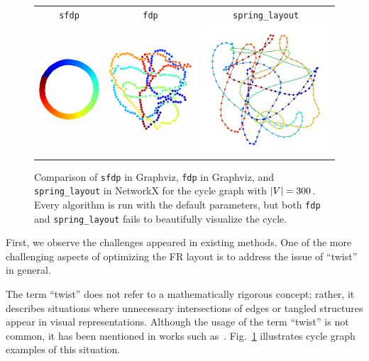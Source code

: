 \documentclass[dvipdfmx,lettersize,journal]{IEEEtran}
\begin{document}
\begin{figure}[t]
  \centering
  \begin{tabular}{ccc}
    \texttt{sfdp}                                                  & \texttt{fdp} & \texttt{spring\_layout} \\
    \includegraphics[width=0.27\columnwidth]{cycle/cycle_sfdp.png} &
    \includegraphics[width=0.27\columnwidth]{cycle/cycle_fdp.png}  &
    \includegraphics[width=0.27\columnwidth]{cycle/cycle_fr.png}                                            \\
  \end{tabular}
  \caption{
    Comparison of \texttt{sfdp} in Graphviz, \texttt{fdp} in Graphviz, and \texttt{spring\_layout} in NetworkX for the cycle graph with $\abs{V} = 300$.
    Every algorithm is run with the default parameters, but both \texttt{fdp} and \texttt{spring\_layout} fails to beautifully visualize the cycle.
  }
  \label{fig:cycle}
\end{figure}

First, we observe the challenges appeared in existing methods.
One of the more challenging aspects of optimizing the FR layout is to address the issue of ``twist'' in general.

The term ``twist'' does not refer to a mathematically rigorous concept; rather, it describes situations where unnecessary intersections of edges or tangled structures appear in visual representations.
Although the usage of the term ``twist'' is not common, it has been mentioned in works such as~\cite{cheongSnapshotVisualizationComplex2018}. Fig.~\ref{fig:cycle} illustrates cycle graph examples of this situation.
\end{document}
